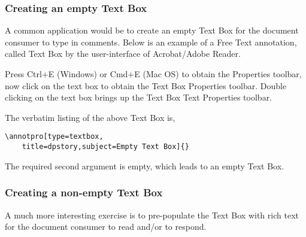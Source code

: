 \documentclass[12pt]{article}
\let\app\textsf
\let\uif\textsf
\begin{document}
\subsubsection{Creating an empty \texorpdfstring{\protect\uif{Text Box}}{Text Box}}

A common application would be to create an empty \uif{Text Box} for the
document consumer to type in comments. Below is an example of a \uif{Free
Text} annotation, called \uif{Text Box} by the user-interface of
\app{Acrobat}/\app{Adobe Reader}.
\begin{flushleft} %
\begin{minipage}{2in}
\annotpro[title=dpstory,type=textbox,subject=Empty Text Box]{}
\end{minipage}\hfill
\begin{minipage}{\linewidth-2in-10pt}\small
Press \uif{Ctrl+E} (\app{Windows}) or \uif{Cmd+E} (\app{Mac OS}) to obtain
the \uif{Properties} toolbar, now click on the text box  to obtain the
\uif{Text Box Properties} toolbar. Double clicking on the text box
brings up the \uif{Text Box Text Properties} toolbar.
\end{minipage}
\end{flushleft}
The verbatim listing of the above \uif{Text Box} is,
\begin{Verbatim}[xleftmargin=\leftmargini]
\annotpro[type=textbox,
    title=dpstory,subject=Empty Text Box]{}
\end{Verbatim}
The required second argument is empty, which leads to an empty \uif{Text Box}.

\subsubsection{Creating a non-empty \texorpdfstring{\protect\uif{Text Box}}{Text Box}}\label{ss:textbox}

A much more interesting exercise is to pre-populate the \uif{Text Box} with rich text for the
document consumer to read and/or to respond.

\end{document}
